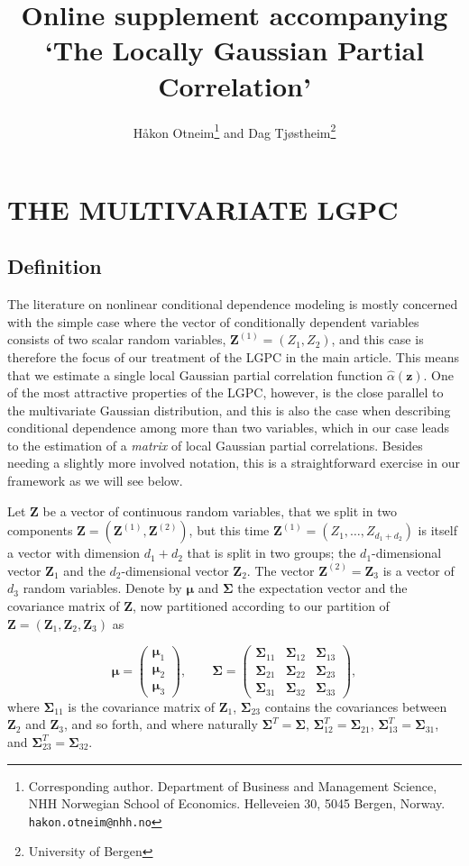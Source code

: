 \documentclass[
  12pt,
  letterpaper]{article}
\title{Online supplement accompanying `The Locally Gaussian Partial Correlation'}
\author{Håkon Otneim\footnote{Corresponding author. Department of Business and Management Science, NHH Norwegian School of Economics. Helleveien 30, 5045 Bergen, Norway. \texttt{hakon.otneim@nhh.no}} and Dag Tjøstheim\footnote{University of Bergen}}
\date{}
\numberwithin{equation}{section}
\newcommand{\Z}{\bm{Z}}
\newcommand{\z}{\bm{z}}
\newcommand{\Zone}{\bm{Z}^{(1)}}
\newcommand{\Ztwo}{\bm{Z}^{(2)}}
\newcommand{\fmu}{\bm{\mu}}
\newcommand{\fSigma}{\bm{\Sigma}}
\begin{document}
\maketitle

\hypertarget{the-multivariate-lgpc}{%
\section{THE MULTIVARIATE LGPC}\label{the-multivariate-lgpc}}

\hypertarget{definition}{%
\subsection{Definition}\label{definition}}

The literature on nonlinear conditional dependence modeling is mostly concerned with the simple case where the vector of conditionally dependent variables consists of two scalar random variables, \(\Zone = (Z_1, Z_2)\), and this case is therefore the focus of our treatment of the LGPC in the main article. This means that we estimate a single local Gaussian partial correlation function \(\widehat \alpha(\z)\). One of the most attractive properties of the LGPC, however, is the close parallel to the multivariate Gaussian distribution, and this is also the case when describing conditional dependence among more than two variables, which in our case leads to the estimation of a \emph{matrix} of local Gaussian partial correlations. Besides needing a slightly more involved notation, this is a straightforward exercise in our framework as we will see below.

Let \(\Z\) be a vector of continuous random variables, that we split in two components \(\Z = (\Zone, \Ztwo)\), but this time \(\Zone = (Z_1, \ldots, Z_{d_1 + d_2})\) is itself a vector with dimension \(d_1 + d_2\) that is split in two groups; the \(d_1\)-dimensional vector \(\Z_1\) and the \(d_2\)-dimensional vector \(\Z_2\). The vector \(\Ztwo = \Z_3\) is a vector of \(d_3\) random variables. Denote by \(\fmu\) and \(\fSigma\) the expectation vector and the covariance matrix of \(\Z\), now partitioned according to our partition of \(\Z = (\Z_1, \Z_2, \Z_3)\) as

\[\fmu = \begin{pmatrix} \fmu_1 \\ \fmu_2 \\ \fmu_3 \end{pmatrix}, \qquad \fSigma = \begin{pmatrix} \fSigma_{11} & \fSigma_{12} & \fSigma_{13} \\ \fSigma_{21} & \fSigma_{22} & \fSigma_{23} \\ \fSigma_{31} & \fSigma_{32} & \fSigma_{33} \end{pmatrix},\]
where \(\fSigma_{11}\) is the covariance matrix of \(\Z_1\), \(\fSigma_{23}\) contains the covariances between \(\Z_2\) and \(\Z_3\), and so forth, and where naturally \(\fSigma^T = \fSigma\), \(\fSigma_{12}^T = \fSigma_{21}\), \(\fSigma_{13}^T = \fSigma_{31}\), and \(\fSigma_{23}^T = \fSigma_{32}\).
\end{document}
